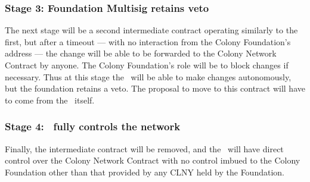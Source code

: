 \subsubsection*{Stage 3: Foundation Multisig retains veto}
The next stage will be a second intermediate contract operating similarly to the first, but after a timeout --- with no interaction from the Colony Foundation's address --- the change will be able to be forwarded to the Colony Network Contract by anyone. The Colony Foundation's role will be to block changes if necessary. Thus at this stage the \rc\ will be able to make changes autonomously, but the foundation retains a veto.  The proposal to move to this contract will have to come from the \rc\ itself. 

\subsubsection*{Stage 4: \rc\ fully controls the network}
Finally, the intermediate contract will be removed, and the \rc\ will have direct control over the Colony Network Contract with no control imbued to the Colony Foundation other than that provided by any CLNY held by the Foundation. 

